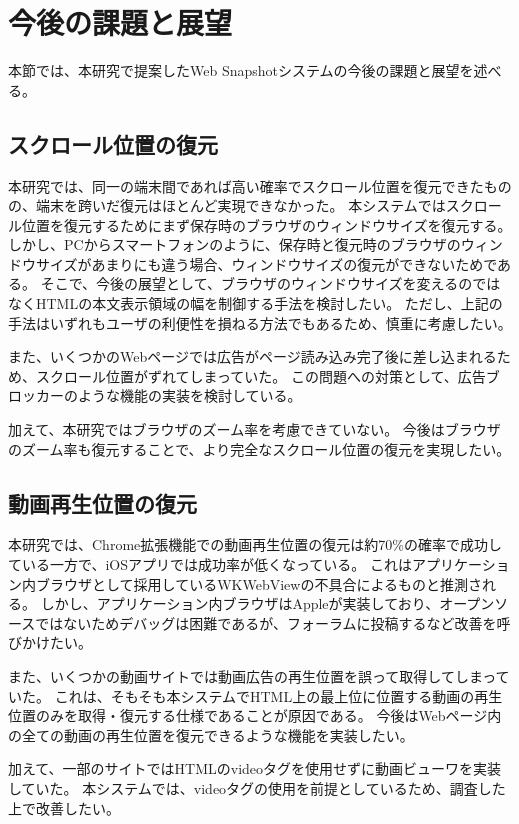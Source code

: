 \section{今後の課題と展望}
本節では、本研究で提案したWeb Snapshotシステムの今後の課題と展望を述べる。

\subsection{スクロール位置の復元}
本研究では、同一の端末間であれば高い確率でスクロール位置を復元できたものの、端末を跨いだ復元はほとんど実現できなかった。
本システムではスクロール位置を復元するためにまず保存時のブラウザのウィンドウサイズを復元する。
しかし、PCからスマートフォンのように、保存時と復元時のブラウザのウィンドウサイズがあまりにも違う場合、ウィンドウサイズの復元ができないためである。
そこで、今後の展望として、ブラウザのウィンドウサイズを変えるのではなくHTMLの本文表示領域の幅を制御する手法を検討したい。
ただし、上記の手法はいずれもユーザの利便性を損ねる方法でもあるため、慎重に考慮したい。

また、いくつかのWebページでは広告がページ読み込み完了後に差し込まれるため、スクロール位置がずれてしまっていた。
この問題への対策として、広告ブロッカーのような機能の実装を検討している。

加えて、本研究ではブラウザのズーム率を考慮できていない。
今後はブラウザのズーム率も復元することで、より完全なスクロール位置の復元を実現したい。

\subsection{動画再生位置の復元}
本研究では、Chrome拡張機能での動画再生位置の復元は約70\%の確率で成功している一方で、iOSアプリでは成功率が低くなっている。
これはアプリケーション内ブラウザとして採用しているWKWebViewの不具合によるものと推測される。
しかし、アプリケーション内ブラウザはAppleが実装しており、オープンソースではないためデバッグは困難であるが、フォーラムに投稿するなど改善を呼びかけたい。

また、いくつかの動画サイトでは動画広告の再生位置を誤って取得してしまっていた。
これは、そもそも本システムでHTML上の最上位に位置する動画の再生位置のみを取得・復元する仕様であることが原因である。
今後はWebページ内の全ての動画の再生位置を復元できるような機能を実装したい。

加えて、一部のサイトではHTMLのvideoタグを使用せずに動画ビューワを実装していた。
本システムでは、videoタグの使用を前提としているため、調査した上で改善したい。

